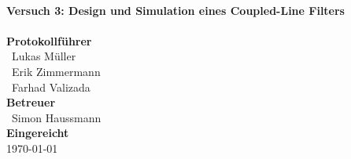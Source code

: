 \documentclass[a4paper, 11pt, oneside]{Thesis}  %
\begin{document}
\begin{titlepage}
\HRule \\[0.4cm]
{ \huge \bfseries Versuch 3: Design  und Simulation eines Coupled-Line Filters}\\[0.4cm] %
\HRule \\[1.5cm]
 
\textbf{Protokollführer}\\
{\large\ Lukas Müller}\\[0.2cm]
{\large\ Erik Zimmermann}\\[0.2cm]
{\large\ Farhad Valizada}\\[0.7cm]

\textbf{Betreuer}\\
{\large\ Simon Haussmann}\\[0.2cm]




\textbf{Eingereicht}\\
{\large \today} %

 

\vfill %

\end{titlepage}


\clearpage  %

\clearpage

\pagestyle{fancy}
\fancyhf{}
\fancyfoot[C]{\thepage} %
\renewcommand{\headrulewidth}{0pt}

\let\oldchapter\chapter
\renewcommand{\chapter}{\clearpage\pagestyle{fancy}\oldchapter}
\end{document}
